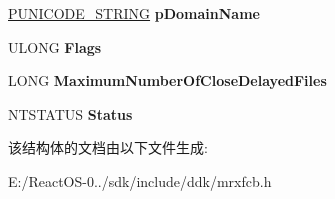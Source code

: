 \begin{DoxyCompactItemize}
\mbox{\label{struct___m_r_x___s_r_v___c_a_l_l___a01fb65736a78b8142b63d3fcb1ee7496}} 
\hyperlink{struct___u_n_i_c_o_d_e___s_t_r_i_n_g}{P\+U\+N\+I\+C\+O\+D\+E\+\_\+\+S\+T\+R\+I\+NG} {\bfseries p\+Domain\+Name}
\item 
\mbox{\label{struct___m_r_x___s_r_v___c_a_l_l___aadb848176d8088f12064b41bbe17e82e}} 
U\+L\+O\+NG {\bfseries Flags}
\item 
\mbox{\label{struct___m_r_x___s_r_v___c_a_l_l___a8dc78d6948169a58227ddf8a84beed3d}} 
L\+O\+NG {\bfseries Maximum\+Number\+Of\+Close\+Delayed\+Files}
\item 
\mbox{\label{struct___m_r_x___s_r_v___c_a_l_l___ad2abb6b6ca095d4012336fbafecb8a34}} 
N\+T\+S\+T\+A\+T\+US {\bfseries Status}
\end{DoxyCompactItemize}


该结构体的文档由以下文件生成\+:\begin{DoxyCompactItemize}
\item 
E\+:/\+React\+O\+S-\/0../sdk/include/ddk/mrxfcb.\+h\end{DoxyCompactItemize}
